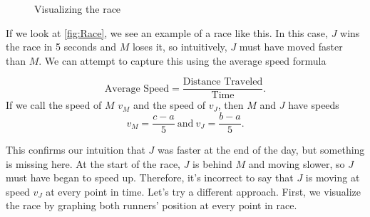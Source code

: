 \begin{exmp}
\begin{figure}[h]
\begin{subfigure}{\textwidth}
  \centering
{}
\end{subfigure}

\begin{subfigure}{\textwidth}
  \centering
\end{subfigure}
\caption{Visualizing the race}
\end{figure}

If we look at \cref{fig:Race}, we see an example of a race like this. In this case, $J$ wins the race in 5 seconds and $M$ loses it, so intuitively, $J$ must have moved faster than $M$. We can attempt to capture this using the average speed formula

\begin{equation}
	\text{Average Speed}=\frac{\text{Distance Traveled}}{\text{Time}}.
\end{equation}
   If we call the speed of $M$ $v_M$ and the speed of $v_J$, then $M$ and $J$ have speeds
\begin{equation}
v_M=\frac{c-a}{5}\ \text{and}\ v_J=\frac{b-a}{5}.
\end{equation}

This confirms our intuition that $J$ was faster at the end of the day, but something is missing here. At the start of the race, $J$ is behind $M$ and moving slower, so $J$ must have began to speed up. Therefore, it's incorrect to say that $J$ is moving at speed $v_J$ at every point in time. Let's try a different approach. First, we visualize the race by graphing both runners' position at every point in race.

\begin{figure}
  \hspace{-5mm}
\begin{subfigure}{0.35\textwidth}
  \centering
\end{subfigure}
\end{figure}
\end{exmp}
